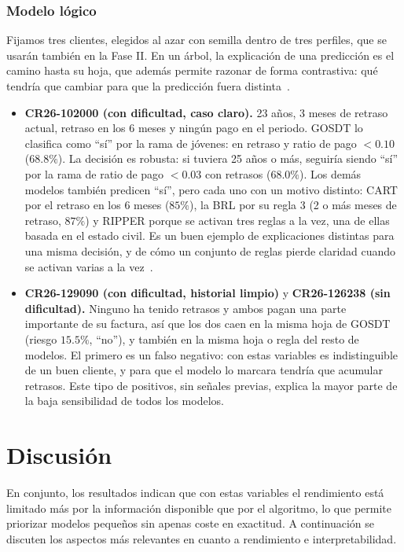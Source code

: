 \documentclass[a4paper,11pt]{article}
\begin{document}
\subsubsection{Modelo lógico}
Fijamos tres clientes, elegidos al azar con semilla dentro de tres perfiles, que se usarán también en la Fase II. En un árbol, la explicación de una predicción es el camino hasta su hoja, que además permite razonar de forma contrastiva: qué tendría que cambiar para que la predicción fuera distinta~\cite{slidesLogical}.

\begin{itemize}
    \item \textbf{CR26-102000 (con dificultad, caso claro).} 23 años, 3 meses de retraso actual, retraso en los 6 meses y ningún pago en el periodo. GOSDT lo clasifica como ``sí'' por la rama de jóvenes: en retraso y ratio de pago $< 0.10$ ($68.8\%$). La decisión es robusta: si tuviera 25 años o más, seguiría siendo ``sí'' por la rama de ratio de pago $< 0.03$ con retrasos ($68.0\%$). Los demás modelos también predicen ``sí'', pero cada uno con un motivo distinto: CART por el retraso en los 6 meses ($85\%$), la BRL por su regla 3 (2 o más meses de retraso, $87\%$) y RIPPER porque se activan tres reglas a la vez, una de ellas basada en el estado civil. Es un buen ejemplo de explicaciones distintas para una misma decisión, y de cómo un conjunto de reglas pierde claridad cuando se activan varias a la vez~\cite{slidesLogical}.
    \item \textbf{CR26-129090 (con dificultad, historial limpio)} y \textbf{CR26-126238 (sin dificultad).} Ninguno ha tenido retrasos y ambos pagan una parte importante de su factura, así que los dos caen en la misma hoja de GOSDT (riesgo $15.5\%$, ``no''), y también en la misma hoja o regla del resto de modelos. El primero es un falso negativo: con estas variables es indistinguible de un buen cliente, y para que el modelo lo marcara tendría que acumular retrasos. Este tipo de positivos, sin señales previas, explica la mayor parte de la baja sensibilidad de todos los modelos.
\end{itemize}

\section{Discusión}

En conjunto, los resultados indican que con estas variables el rendimiento está limitado más por la información disponible que por el algoritmo, lo que permite priorizar modelos pequeños sin apenas coste en exactitud. A continuación se discuten los aspectos más relevantes en cuanto a rendimiento e interpretabilidad.
\end{document}
